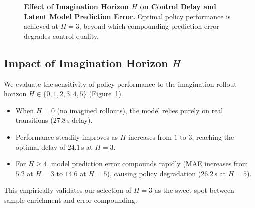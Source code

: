 \documentclass[11pt,a4paper]{article}
\begin{document}
\begin{figure}[t]
\centering
{}
\caption{\textbf{Effect of Imagination Horizon $H$ on Control Delay and Latent Model Prediction Error.} Optimal policy performance is achieved at $H=3$, beyond which compounding prediction error degrades control quality.}
\label{fig:horizon_curve}
\end{figure}

\subsection{Impact of Imagination Horizon $H$}
We evaluate the sensitivity of policy performance to the imagination rollout horizon $H \in \{0, 1, 2, 3, 4, 5\}$ (Figure~\ref{fig:horizon_curve}).
\begin{itemize}
    \item When $H=0$ (no imagined rollouts), the model relies purely on real transitions ($27.8$\,s delay).
    \item Performance steadily improves as $H$ increases from $1$ to $3$, reaching the optimal delay of $24.1$\,s at $H=3$.
    \item For $H \geq 4$, model prediction error compounds rapidly (MAE increases from $5.2$ at $H=3$ to $14.6$ at $H=5$), causing policy degradation ($26.2$\,s at $H=5$).
\end{itemize}
This empirically validates our selection of $H=3$ as the sweet spot between sample enrichment and error compounding.
\end{document}
